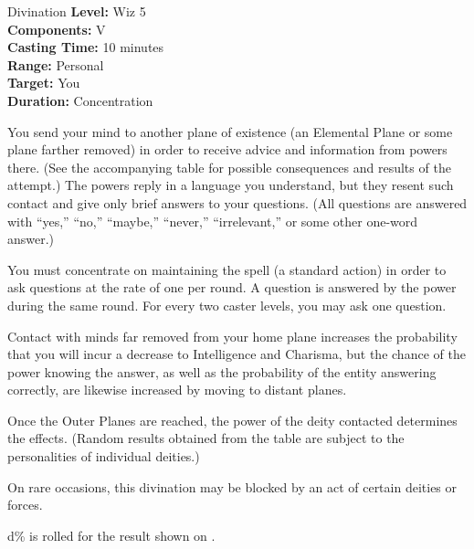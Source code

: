 {Divination}
{
	\textbf{Level:}
	Wiz 5\\
	\textbf{Components:}
	V\\
	\textbf{Casting Time:}
	10 minutes\\
	\textbf{Range:}
	Personal\\
	\textbf{Target:}
	You\\
	\textbf{Duration:}
	Concentration\\
}
{
	You send your mind to another plane of existence (an Elemental Plane or some plane farther removed) in order to receive advice and information from powers there. (See the accompanying table for possible consequences and results of the attempt.) The powers reply in a language you understand, but they resent such contact and give only brief answers to your questions. (All questions are answered with ``yes,'' ``no,'' ``maybe,'' ``never,'' ``irrelevant,'' or some other one-word answer.)

	You must concentrate on maintaining the spell (a standard action) in order to ask questions at the rate of one per round. A question is answered by the power during the same round. For every two caster levels, you may ask one question.

	Contact with minds far removed from your home plane increases the probability that you will incur a decrease to Intelligence and Charisma, but the chance of the power knowing the answer, as well as the probability of the entity answering correctly, are likewise increased by moving to distant planes.

	Once the Outer Planes are reached, the power of the deity contacted determines the effects. (Random results obtained from the table are subject to the personalities of individual deities.)

	On rare occasions, this divination may be blocked by an act of certain deities or forces.

	d\% is rolled for the result shown on .

}
